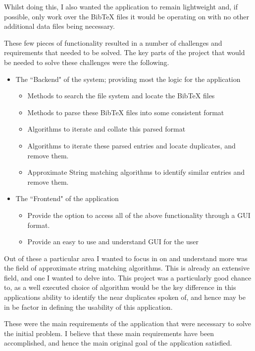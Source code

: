\documentclass[a4paper,11pt]{article}
\begin{document}
Whilst doing this, I also wanted the application to remain lightweight and, if possible, only work over the BibTeX files it would be operating on with no other additional data files being necessary.

These few pieces of functionality resulted in a number of challenges and requirements that needed to be solved. The key parts of the project that would be needed to solve these challenges were the following.
\begin{itemize}
    \item The ``Backend" of the system; providing most the logic for the application
    \begin{itemize}
        \item Methods to search the file system and locate the BibTeX files
        \item Methods to parse these BibTeX files into some consistent format
        \item Algorithms to iterate and collate this parsed format
        \item Algorithms to iterate these parsed entries and locate duplicates, and remove them.
        \item Approximate String matching algorithms to identify similar entries and remove them.
    \end{itemize}
    \item The ``Frontend" of the application
    \begin{itemize}
        \item Provide the option to access all of the above functionality through a GUI format.
        \item Provide an easy to use and understand GUI for the user
    \end{itemize}
\end{itemize}

Out of these a particular area I wanted to focus in on and understand more was the field of approximate string matching algorithms. This is already an extensive field, and one I wanted to delve into. This project was a particularly good chance to, as a well executed choice of algorithm would be the key difference in this applications ability to identify the near duplicates spoken of, and hence may be in be factor in defining the usability of this application.

These were the main requirements of the application that were necessary to solve the initial problem. I believe that these main requirements have been accomplished, and hence the main original goal of the application satisfied.
\end{document}
